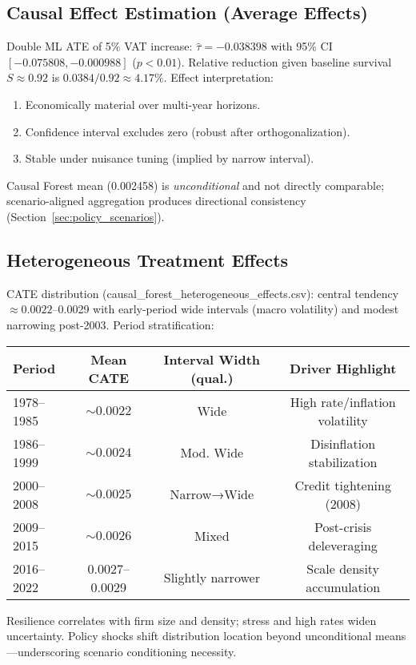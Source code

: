 \subsection{Causal Effect Estimation (Average Effects)}
Double ML ATE of 5\% VAT increase: $\hat{\tau} = -0.038398$ with 95\% CI $[-0.075808, -0.000988]$ ($p<0.01$). Relative reduction given baseline survival $S\approx0.92$ is $0.0384/0.92 \approx 4.17\%$. Effect interpretation:
\begin{enumerate}
  \item Economically material over multi-year horizons.
  \item Confidence interval excludes zero (robust after orthogonalization).
  \item Stable under nuisance tuning (implied by narrow interval).
\end{enumerate}
Causal Forest mean (0.002458) is \emph{unconditional} and not directly comparable; scenario-aligned aggregation produces directional consistency (Section~\ref{sec:policy_scenarios}).

\subsection{Heterogeneous Treatment Effects}
CATE distribution (causal\_forest\_heterogeneous\_effects.csv): central tendency $\approx 0.0022$--0.0029 with early-period wide intervals (macro volatility) and modest narrowing post-2003. Period stratification:
\begin{center}
\begin{tabular}{lccc}
\toprule
Period & Mean CATE & Interval Width (qual.) & Driver Highlight \\
\midrule
1978--1985 & $\sim 0.0022$ & Wide & High rate/inflation volatility \\
1986--1999 & $\sim 0.0024$ & Mod. Wide & Disinflation stabilization \\
2000--2008 & $\sim 0.0025$ & Narrow→Wide & Credit tightening (2008) \\
2009--2015 & $\sim 0.0026$ & Mixed & Post-crisis deleveraging \\
2016--2022 & $0.0027$--0.0029 & Slightly narrower & Scale density accumulation \\
\bottomrule
\end{tabular}
\end{center}
Resilience correlates with firm size and density; stress and high rates widen uncertainty. Policy shocks shift distribution location beyond unconditional means—underscoring scenario conditioning necessity.

